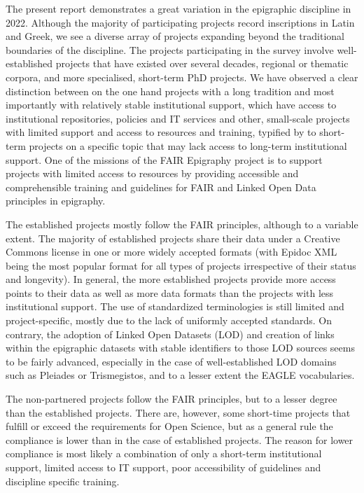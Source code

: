 \documentclass[
  12pt,
]{scrreprt}
\begin{document}
The present report demonstrates a great variation in the epigraphic
discipline in 2022. Although the majority of participating projects
record inscriptions in Latin and Greek, we see a diverse array of
projects expanding beyond the traditional boundaries of the discipline.
The projects participating in the survey involve well-established
projects that have existed over several decades, regional or thematic
corpora, and more specialised, short-term PhD projects. We have observed
a clear distinction between on the one hand projects with a long
tradition and most importantly with relatively stable institutional
support, which have access to institutional repositories, policies and
IT services and other, small-scale projects with limited support and
access to resources and training, typified by to short-term projects on
a specific topic that may lack access to long-term institutional
support. One of the missions of the FAIR Epigraphy project is to support
projects with limited access to resources by providing accessible and
comprehensible training and guidelines for FAIR and Linked Open Data
principles in epigraphy.

The established projects mostly follow the FAIR principles, although to
a variable extent. The majority of established projects share their data
under a Creative Commons license in one or more widely accepted formats
(with Epidoc XML being the most popular format for all types of projects
irrespective of their status and longevity). In general, the more
established projects provide more access points to their data as well as
more data formats than the projects with less institutional support. The
use of standardized terminologies is still limited and project-specific,
mostly due to the lack of uniformly accepted standards. On contrary, the
adoption of Linked Open Datasets (LOD) and creation of links within the
epigraphic datasets with stable identifiers to those LOD sources seems
to be fairly advanced, especially in the case of well-established LOD
domains such as Pleiades or Trismegistos, and to a lesser extent the
EAGLE vocabularies.

The non-partnered projects follow the FAIR principles, but to a lesser
degree than the established projects. There are, however, some
short-time projects that fulfill or exceed the requirements for Open
Science, but as a general rule the compliance is lower than in the case
of established projects. The reason for lower compliance is most likely
a combination of only a short-term institutional support, limited access
to IT support, poor accessibility of guidelines and discipline specific
training.
\end{document}
